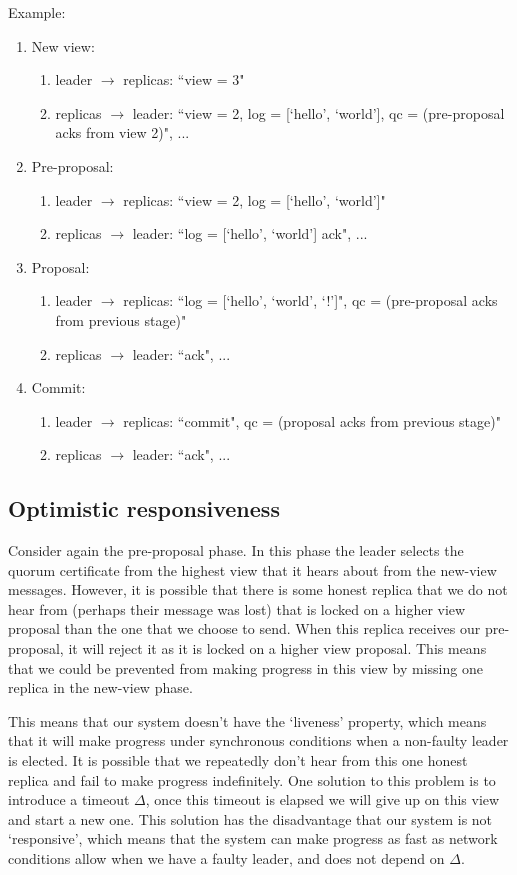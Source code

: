 Example:

\begin{enumerate}
\item New view: 
	\begin{enumerate}
	\item leader $\to$ replicas: ``view = 3" 
	\item replicas $\to$ leader: ``view = 2, log = [`hello', `world'], qc = (pre-proposal acks from view 2)", ...
	\end{enumerate}
\item Pre-proposal:
	\begin{enumerate}
	\item leader $\to$ replicas: ``view = 2, log = [`hello', `world']"
	\item replicas $\to$ leader: ``log = [`hello', `world'] ack", ...
	\end{enumerate}
\item Proposal:
	\begin{enumerate}
	\item leader $\to$ replicas: ``log = [`hello', `world', `!']", qc = (pre-proposal acks from previous stage)"
	\item replicas $\to$ leader: ``ack", ...
	\end{enumerate}
\item Commit:
	\begin{enumerate}
	\item leader $\to$ replicas: ``commit", qc = (proposal acks from previous stage)"
	\item replicas $\to$ leader: ``ack", ...
	\end{enumerate}
\end{enumerate}
\subsection{Optimistic responsiveness}
Consider again the pre-proposal phase. In this phase the leader selects the quorum certificate from the highest view that it hears about from the new-view messages. However, it is possible that there is some honest replica that we do not hear from (perhaps their message was lost) that is locked on a higher view proposal than the one that we choose to send. When this replica receives our pre-proposal, it will reject it as it is locked on a higher view proposal. This means that we could be prevented from making progress in this view by missing one replica in the new-view phase.

This means that our system doesn't have the `liveness' property, which means that it will make progress under synchronous conditions when a non-faulty leader is elected. It is possible that we repeatedly don't hear from this one honest replica and fail to make progress indefinitely. One solution to this problem is to introduce a timeout $\Delta$, once this timeout is elapsed we will give up on this view and start a new one. This solution has the disadvantage that our system is not `responsive', which means that the system can make progress as fast as network conditions allow when we have a faulty leader, and does not depend on $\Delta$.

